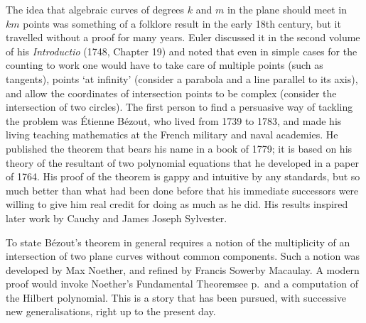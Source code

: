 The idea that algebraic curves of degrees $k$ and $m$ in the plane should
meet in $km$ points was something of a folklore result in the early
18th century, but it travelled without a proof for many years. Euler
discussed it in the second volume of his  \emph{Introductio} (1748,
Chapter 19) and noted that even in simple cases  for the counting to
%
work one would have to take care of multiple points
%
(such as tangents),
points `at infinity'
%
(consider a parabola
%
and a line parallel to its
axis), and allow the  coordinates of intersection points to be complex
(consider the intersection of two circles). The first person to find
a persuasive way of tackling the problem was \'Etienne B\'ezout,
%
 who
lived from 1739 to 1783, and made his living teaching mathematics at
the French military and naval academies. He published the theorem that
bears his name in a book of 1779; it is based on his theory of the
resultant
%
of two polynomial equations that he developed in a paper of
1764. His proof of the theorem is gappy and intuitive by any standards,
but so much better than what had been done before that his immediate
successors were willing to give him real credit for doing as much as he
%
%
did. His results inspired later work by Cauchy and James Joseph Sylvester.

To state  B\'ezout's theorem in general requires a notion of the
multiplicity
%
of an intersection of two plane curves without common
components. Such a notion was developed by Max Noether,
\vadjust{\goodbreak}%
%
 and refined
%
by Francis Sowerby Macaulay.
 A modern proof would invoke Noether's
Fundamental Theorem\emdash see p.~\pageref{Noether'sFT}\emdash and a
computation of the Hilbert polynomial.
%
%
 This is a story that  has been
pursued, with successive new generalisations, right up to the present day.


